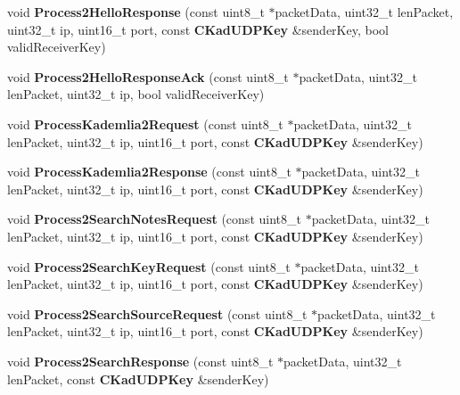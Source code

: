 \begin{DoxyCompactItemize}
\item 
void {\bfseries Process2HelloResponse} (const uint8\_\-t $\ast$packetData, uint32\_\-t lenPacket, uint32\_\-t ip, uint16\_\-t port, const {\bf CKadUDPKey} \&senderKey, bool validReceiverKey)\label{classKademlia_1_1CKademliaUDPListener_ae87ac53aad26c8876a620ed25a005165}

\item 
void {\bfseries Process2HelloResponseAck} (const uint8\_\-t $\ast$packetData, uint32\_\-t lenPacket, uint32\_\-t ip, bool validReceiverKey)\label{classKademlia_1_1CKademliaUDPListener_aa0321b6540abbf20fa3b8c81a9f4dd69}

\item 
void {\bfseries ProcessKademlia2Request} (const uint8\_\-t $\ast$packetData, uint32\_\-t lenPacket, uint32\_\-t ip, uint16\_\-t port, const {\bf CKadUDPKey} \&senderKey)\label{classKademlia_1_1CKademliaUDPListener_a53594374f21eb70b0e070cbeb3f355cc}

\item 
void {\bfseries ProcessKademlia2Response} (const uint8\_\-t $\ast$packetData, uint32\_\-t lenPacket, uint32\_\-t ip, uint16\_\-t port, const {\bf CKadUDPKey} \&senderKey)\label{classKademlia_1_1CKademliaUDPListener_ad367afe032cdcf8208d387e3b7fc3eb6}

\item 
void {\bfseries Process2SearchNotesRequest} (const uint8\_\-t $\ast$packetData, uint32\_\-t lenPacket, uint32\_\-t ip, uint16\_\-t port, const {\bf CKadUDPKey} \&senderKey)\label{classKademlia_1_1CKademliaUDPListener_a4679f81552c1b2ca92bd2b664cb29719}

\item 
void {\bfseries Process2SearchKeyRequest} (const uint8\_\-t $\ast$packetData, uint32\_\-t lenPacket, uint32\_\-t ip, uint16\_\-t port, const {\bf CKadUDPKey} \&senderKey)\label{classKademlia_1_1CKademliaUDPListener_a34a0fb30bb63d873f9be8a144f2dfdaa}

\item 
void {\bfseries Process2SearchSourceRequest} (const uint8\_\-t $\ast$packetData, uint32\_\-t lenPacket, uint32\_\-t ip, uint16\_\-t port, const {\bf CKadUDPKey} \&senderKey)\label{classKademlia_1_1CKademliaUDPListener_a92efb62d19e16d1a7233372844298eda}

\item 
void {\bfseries Process2SearchResponse} (const uint8\_\-t $\ast$packetData, uint32\_\-t lenPacket, const {\bf CKadUDPKey} \&senderKey)\label{classKademlia_1_1CKademliaUDPListener_a7e3017219c093d72d5a05fa941c9d5fe}


\end{DoxyCompactItemize}
